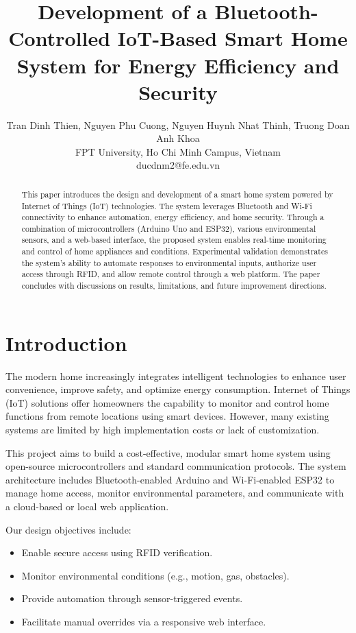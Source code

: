 \documentclass[conference, onecolumn]{IEEEtran}
\begin{document}
\title{Development of a Bluetooth-Controlled IoT-Based Smart Home System for Energy Efficiency and Security}

\author{
Tran Dinh Thien, Nguyen Phu Cuong, Nguyen Huynh Nhat Thinh, Truong Doan Anh Khoa\\
FPT University, Ho Chi Minh Campus, Vietnam\\
 ducdnm2@fe.edu.vn
}

\maketitle

\begin{abstract}
This paper introduces the design and development of a smart home system powered by Internet of Things (IoT) technologies. The system leverages Bluetooth and Wi-Fi connectivity to enhance automation, energy efficiency, and home security. Through a combination of microcontrollers (Arduino Uno and ESP32), various environmental sensors, and a web-based interface, the proposed system enables real-time monitoring and control of home appliances and conditions. Experimental validation demonstrates the system's ability to automate responses to environmental inputs, authorize user access through RFID, and allow remote control through a web platform. The paper concludes with discussions on results, limitations, and future improvement directions.
\end{abstract}

\section{Introduction}
The modern home increasingly integrates intelligent technologies to enhance user convenience, improve safety, and optimize energy consumption. Internet of Things (IoT) solutions offer homeowners the capability to monitor and control home functions from remote locations using smart devices. However, many existing systems are limited by high implementation costs or lack of customization.

This project aims to build a cost-effective, modular smart home system using open-source microcontrollers and standard communication protocols. The system architecture includes Bluetooth-enabled Arduino and Wi-Fi-enabled ESP32 to manage home access, monitor environmental parameters, and communicate with a cloud-based or local web application.

Our design objectives include:
\begin{itemize}
    \item Enable secure access using RFID verification.
    \item Monitor environmental conditions (e.g., motion, gas, obstacles).
    \item Provide automation through sensor-triggered events.
    \item Facilitate manual overrides via a responsive web interface.
\end{itemize}
\end{document}
